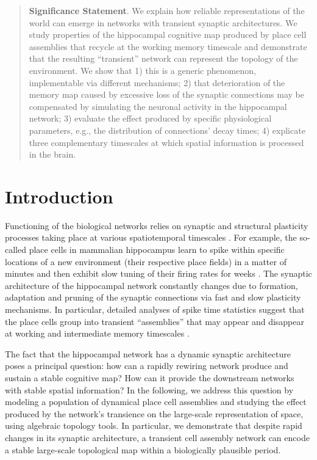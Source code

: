 \documentclass[12pt,tightenlines]{revtex4}
\begin{document}
\begin{abstract}
\textbf{Significance Statement}. We explain how reliable representations of the world can emerge in networks with 
transient synaptic architectures. We study properties of the hippocampal cognitive map produced by place cell assemblies 
that recycle at the working memory timescale and demonstrate that the resulting ``transient'' network can represent 
the topology of the environment. We show that 1) this is a generic phenomenon, implementable via different mechanisms; 
2) that deterioration of the memory map caused by excessive loss of the synaptic connections may be compensated by 
simulating the neuronal activity in the hippocampal network; 3) evaluate the effect produced by specific physiological 
parameters, e.g., the distribution of connections' decay times; 4) explicate three complementary timescales at which 
spatial information is processed in the brain.

\end{abstract}

\maketitle

\newpage

\section{Introduction}
\label{section:intro}

Functioning of the biological networks relies on synaptic and structural plasticity processes taking place at various 
spatiotemporal timescales \cite{Bi, Leuner,Caroni}. For example, the so-called place cells in mammalian hippocampus 
learn to spike within specific locations of a new environment (their respective place fields) in a matter of minutes and 
then exhibit slow tuning of their firing rates for weeks  \cite{Best,Frank,Karlsson}. The synaptic architecture of the 
hippocampal network constantly changes due to formation, adaptation and pruning of the synaptic connections via fast 
and slow plasticity mechanisms. In particular, detailed analyses of spike time statistics suggest that the place cells group 
into transient ``assemblies'' that may appear and disappear at working and intermediate memory timescales 
\cite{Harris,Buzsaki1}.

The fact that the hippocampal network has a dynamic synaptic architecture poses a principal question: how can a 
rapidly rewiring network produce and sustain a stable cognitive map? How can it provide the downstream networks 
with stable spatial information? In the following, we address this question by modeling a population of dynamical 
place cell assemblies and studying the effect produced by the network's transience on the large-scale representation 
of space, using algebraic topology tools. In particular, we demonstrate that despite rapid changes in its synaptic 
architecture, a transient cell assembly network can encode a stable large-scale topological map within a biologically 
plausible period.
\end{document}
